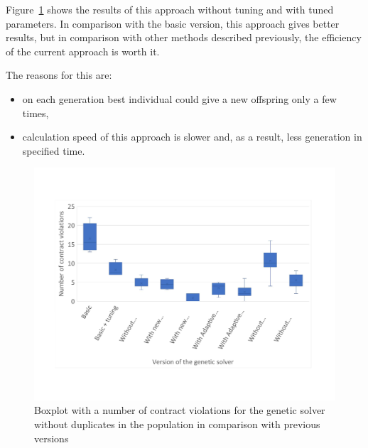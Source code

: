Figure~\ref{fig:boxplotsolverNoDuplicates} shows the results of this approach without tuning and with tuned parameters. In comparison with the basic version, this approach gives better results, but in comparison with other methods described previously, the efficiency of the current approach is worth it.

The reasons for this are:
\begin{itemize}
	\item on each generation best individual could give a new offspring only a few times, 
	\item calculation speed of this approach is slower and, as a result, less generation in specified time.
\end{itemize}


\begin{figure}
	\centering
	\includegraphics[width=\textwidth]{images/BoxPlotSolverNoDuplicates.pdf}
	\caption[Boxplot with a number of contract violations for the genetic solver without duplicates in the population in comparison with previous versions]{Boxplot with a number of contract violations for the genetic solver without duplicates in the population in comparison with previous versions}
	\label{fig:boxplotsolverNoDuplicates}
\end{figure}

